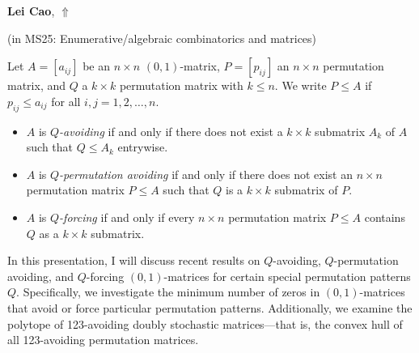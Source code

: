 \documentclass[ILAS2025-program.tex]{subfiles}
\begin{document}
\hypertarget{down0369}{}\begin{ilasabstract}
    
\textbf{Lei Cao},  \hfill \hyperlink{up0369}{$\Uparrow$}
    
    
(in {\color{mstitle}MS25: Enumerative/algebraic combinatorics and matrices})
        
\mtskip
    Let $A = [a_{ij}]$ be an $n \times n$ $(0,1)$-matrix, $P = [p_{ij}]$ an $n \times n$ permutation matrix, and $Q$ a $k \times k$ permutation matrix with $k \leq n$. We write $P \leq A$ if $p_{ij} \leq a_{ij}$ for all $i, j = 1, 2, \ldots, n$.

\begin{itemize}
    \item $A$ is \emph{$Q$-avoiding} if and only if there does not exist a $k \times k$ submatrix $A_k$ of $A$ such that $Q \leq A_k$ entrywise.

    \item $A$ is \emph{$Q$-permutation avoiding} if and only if there does not exist an $n \times n$ permutation matrix $P \leq A$ such that $Q$ is a $k \times k$ submatrix of $P$.

    \item $A$ is \emph{$Q$-forcing} if and only if every $n \times n$ permutation matrix $P \leq A$ contains $Q$ as a $k \times k$ submatrix.
\end{itemize}



In this presentation, I will discuss recent results on $Q$-avoiding, $Q$-permutation avoiding, and $Q$-forcing $(0,1)$-matrices for certain special permutation patterns $Q$. Specifically, we investigate the minimum number of zeros in $(0,1)$-matrices that avoid or force particular permutation patterns. Additionally, we examine the polytope of 123-avoiding doubly stochastic matrices—that is, the convex hull of all 123-avoiding permutation matrices.

\end{ilasabstract}
    
\end{document}
